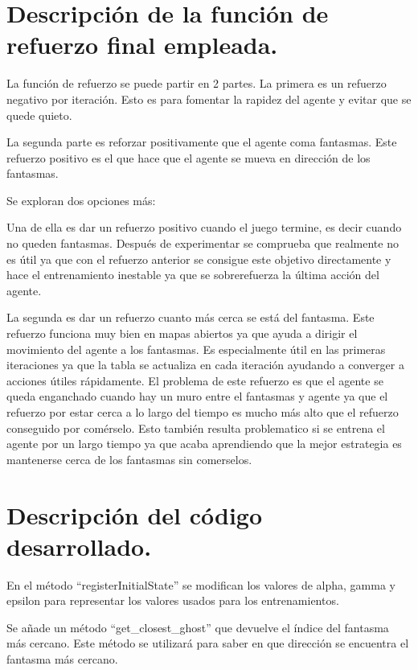 \documentclass[12pt]{article}
\begin{document}
    \section{Descripción de la función de refuerzo final empleada.}
    La función de refuerzo se puede partir en 2 partes.
    La primera es un refuerzo negativo por iteración.
    Esto es para fomentar la rapidez del agente y evitar que se quede quieto.
    \newline

    La segunda parte es reforzar positivamente que el agente coma fantasmas.
    Este refuerzo positivo es el que hace que el agente se mueva en dirección de los fantasmas.
    \newline

    Se exploran dos opciones más:

    Una de ella es dar un refuerzo positivo cuando el juego termine, es decir
    cuando no queden fantasmas.
    Después de experimentar se comprueba que realmente no es útil ya que con el refuerzo anterior se consigue
    este objetivo directamente y hace el entrenamiento inestable ya que se sobrerefuerza la última acción del agente.

    La segunda es dar un refuerzo cuanto más cerca se está del fantasma.
    Este refuerzo funciona muy bien en mapas abiertos ya que ayuda a dirigir el movimiento del agente a los
    fantasmas.
    Es especialmente útil en las primeras iteraciones ya que la tabla se actualiza en cada iteración
    ayudando a converger a acciones útiles rápidamente.
    El problema de este refuerzo es que el agente se queda enganchado cuando hay un muro entre el fantasmas y agente
    ya que el refuerzo por estar cerca a lo largo del tiempo es mucho más alto que el refuerzo conseguido por
    comérselo.
    Esto también resulta problematico si se entrena el agente por un largo tiempo ya que acaba aprendiendo
    que la mejor estrategia es mantenerse cerca de los fantasmas sin comerselos.


    \section{Descripción del código desarrollado.}
    En el método ``registerInitialState'' se modifican los valores de alpha, gamma y epsilon para
    representar los valores usados para los entrenamientos.

    Se añade un método ``get\_closest\_ghost'' que devuelve el índice del fantasma más cercano.
    Este método se utilizará para saber en que dirección se encuentra el fantasma más cercano.
\end{document}
